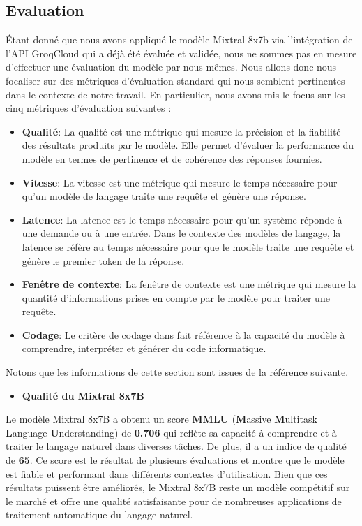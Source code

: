 \subsection{Evaluation}
Étant donné que nous avons appliqué le modèle Mixtral 8x7b via l'intégration de l'API GroqCloud qui a déjà été évaluée et validée, nous ne sommes pas en mesure d'effectuer une évaluation du modèle par nous-mêmes. Nous allons donc nous focaliser sur des métriques d'évaluation standard qui nous semblent pertinentes dans le contexte de notre travail. En particulier, nous avons mis le focus sur les cinq métriques d'évaluation suivantes :
\begin{itemize}
    \item \textbf{Qualité}: La qualité est une métrique qui mesure la précision et la fiabilité des résultats produits par le modèle. Elle permet d'évaluer la performance du modèle en termes de pertinence et de cohérence des réponses fournies.
    \item \textbf{Vitesse}: La vitesse est une métrique qui mesure le temps nécessaire pour qu'un modèle de langage traite une requête et génère une réponse.
    \item \textbf{Latence}: La latence est le temps nécessaire pour qu'un système réponde à une demande ou à une entrée. Dans le contexte des modèles de langage, la latence se réfère au temps nécessaire pour que le modèle traite une requête et génère le premier token de la réponse.
    \item \textbf{Fenêtre de contexte}: La fenêtre de contexte est une métrique qui mesure la quantité d'informations prises en compte par le modèle pour traiter une requête.
    \item \textbf{Codage}: Le critère de codage dans fait référence à la capacité du modèle à comprendre, interpréter et générer du code informatique.
\end{itemize}
Notons que les informations de cette section sont issues de la référence suivante. \cite{mixtral8x7b}

\begin{itemize}
    \item \textbf{Qualité du Mixtral 8x7B }
\end{itemize}
\noindent Le modèle Mixtral 8x7B a obtenu un score \textbf{MMLU} (\textbf{M}assive \textbf{M}ultitask \textbf{L}anguage \textbf{U}nderstanding) de \textbf{0.706} qui reflète sa capacité à comprendre et à traiter le langage naturel dans diverses tâches. De plus, il a un indice de qualité de \textbf{65}. Ce score est le résultat de plusieurs évaluations et montre que le modèle est fiable et performant dans différents contextes d'utilisation. Bien que ces résultats puissent être améliorés, le Mixtral 8x7B reste un modèle compétitif sur le marché et offre une qualité satisfaisante pour de nombreuses applications de traitement automatique du langage naturel.

